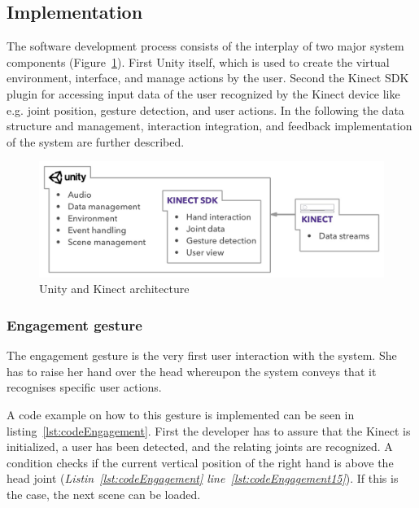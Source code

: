 \subsection{Implementation}
The software development process consists of the interplay of two major system components (Figure~\ref{fig:5_3_unityKinectArchitecture}). First Unity itself, which is used to create the virtual environment, interface, and manage actions by the user. Second the Kinect SDK plugin for accessing input data of the user recognized by the Kinect device like e.g. joint position, gesture detection, and user actions. In the following the data structure and management, interaction integration, and feedback implementation of the system are further described.
\begin{figure}[htb]
	\centering
	\begin{minipage}[t]{1\linewidth}
		\centering
		\includegraphics[width=1\linewidth]{Pictures/5_3_unityKinectArchitecture}
		\caption{Unity and Kinect architecture}
		\label{fig:5_3_unityKinectArchitecture}
	\end{minipage}
\end{figure}

\subsubsection{Engagement gesture}
The engagement gesture is the very first user interaction with the system. %
She has to raise her hand over the head whereupon the system conveys that it recognises specific user actions. 

A code example on how to this gesture is implemented can be seen in listing~\ref{lst:codeEngagement}.
First the developer has to assure that the Kinect is initialized, a user has been detected, and the relating joints are recognized.  A condition checks if the current vertical position of the right hand is above the head joint (\textit{Listin~\ref{lst:codeEngagement} line~\ref{lst:codeEngagement15}}). If this is the case, the next scene can be loaded. 

